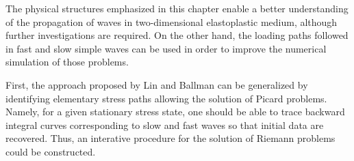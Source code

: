 


The physical structures emphasized in this chapter enable a better understanding of the propagation of waves in two-dimensional elastoplastic medium, although further investigations are required.
On the other hand, the loading paths followed in fast and slow simple waves can be used in order to improve the numerical simulation of those problems.

First, the approach proposed by Lin and Ballman \cite{Lin_et_Ballman} can be generalized by identifying elementary stress paths allowing the solution of Picard problems.
Namely, for a given stationary stress state, one should be able to trace backward integral curves corresponding to slow and fast waves so that initial data are recovered.
Thus, an interative procedure for the solution of Riemann problems could be constructed.

